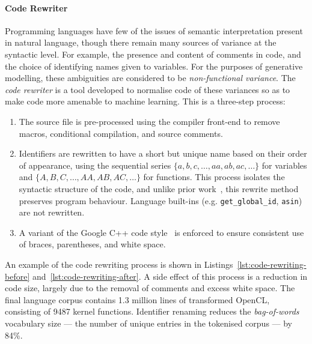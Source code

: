 \paragraph*{Code Rewriter}
\label{subsubsec:clgen-rewriter}

Programming languages have few of the issues of semantic interpretation present in natural language, though there remain many sources of variance at the syntactic level. For example, the presence and content of comments in code, and the choice of identifying names given to variables. For the purposes of generative modelling, these ambiguities are considered to be \emph{non-functional variance}. The \emph{code rewriter} is a tool developed to normalise code of these variances so as to make code more amenable to machine learning. This is a three-step process:

\begin{enumerate}
  \item The source file is pre-processed using the compiler front-end to remove macros, conditional compilation, and source comments.
  \item Identifiers are rewritten to have a short but unique name based on their order of appearance, using the sequential series $\{a,\allowbreak b,\allowbreak c,\allowbreak \ldots,\allowbreak aa,\allowbreak ab,\allowbreak ac,\allowbreak \ldots\}$ for variables and $\{A,\allowbreak B,\allowbreak C,\allowbreak \ldots,\allowbreak AA,\allowbreak AB,\allowbreak AC,\allowbreak \ldots\}$ for functions. This process isolates the syntactic structure of the code, and unlike prior work~\cite{Allamanis2013a}, this rewrite method preserves program behaviour. Language built-ins (e.g. \texttt{get\_global\_id}, \texttt{asin}) are not rewritten.
  \item A variant of the Google C++ code style~\cite{Weinberger2011} is enforced to ensure consistent use of braces, parentheses, and white space.
\end{enumerate}

An example of the code rewriting process is shown in Listings~\ref{lst:code-rewriting-before} and~\ref{lst:code-rewriting-after}. A side effect of this process is a reduction in code size, largely due to the removal of comments and excess white space. The final language corpus contains 1.3 million lines of transformed OpenCL, consisting of 9487 kernel functions. Identifier renaming reduces the \emph{bag-of-words} vocabulary size --- the number of unique entries in the tokenised corpus --- by 84\%.

